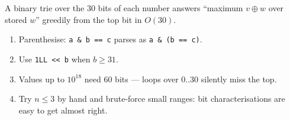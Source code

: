 A binary trie over the $30$ bits of each number answers ``maximum $v\oplus w$
over stored $w$'' greedily from the top bit in $O(30)$.

\begin{takeawaybox}
\begin{enumerate}
  \item Parenthesise: \texttt{a \& b == c} parses as \texttt{a \& (b == c)}.
  \item Use \texttt{1LL << b} when $b\ge31$.
  \item Values up to $10^{18}$ need 60 bits --- loops over $0..30$ silently
        miss the top.
  \item Try $n\le3$ by hand and brute-force small ranges: bit
        characterisations are easy to get almost right.
\end{enumerate}
\end{takeawaybox}

\newpage















